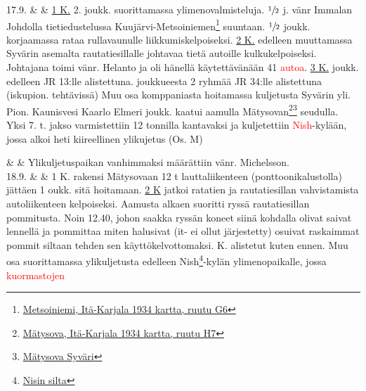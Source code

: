 \documentclass[11pt,a5paper,oneside]{book}
\begin{document}
\newpage

17.9. & & \underline{1 K.} 2. joukk. suorittamassa ylimenovalmisteluja. $\sfrac{1}{2}$ j. vänr Immalan Johdolla tietiedustelussa Kuujärvi-Metsoiniemen\footnote{\href{https://www.google.fi/maps/place/61\%C2\%B008'13.7\%22N+33\%C2\%B050'07.6\%22E/@61.1371306,33.8332443,1153m/}{Metsoiniemi, Itä-Karjala 1934 kartta, ruutu G6}} suuntaan. $\sfrac{1}{2}$ joukk. korjaamassa rataa rullavaunulle liikkumiskelpoiseksi. \newline\newline \underline{2 K.} edelleen muuttamassa Syvärin asemalta rautatiesillalle johtavaa tietä autoille kulkukelpoiseksi. Johtajana toimi vänr. Helanto ja oli hänellä käytettävänään 41 \textcolor{red}{autoa}. \newline\newline \underline{3 K.}  joukk. edelleen JR 13:lle alistettuna.  joukkueesta 2 ryhmää JR 34:lle alistettuna (iskupion. tehtävissä) Muu osa komppaniasta hoitamassa kuljetusta Syvärin yli. Pion. Kaunisvesi Kaarlo Elmeri  joukk. kaatui aamulla Mätysovan\footnote{\href{https://www.google.fi/maps/place/Myatusovo,+Leningrad+Oblast,+Russia,+187790/}{Mätysova, Itä-Karjala 1934 kartta, ruutu H7}}\footnote{\href{https://www.sotahistoriallisetkohteet.fi/app/sights/view/-/id/768/country/9/area/85/}{Mätysova Syväri}} seudulla. Yksi 7. t. jakso varmistettiin 12 tonnilla kantavaksi ja kuljetettiin \textcolor{red}{Nish}-kylään, jossa alkoi heti kiireellinen ylikujetus (Os. M) \\

\taulustop


& & Ylikuljetuspaikan vanhimmaksi määrättiin vänr. Michelsson. \newline\newline\newline \\

18.9. & & 1 K. rakensi Mätysovaan 12 t lauttaliikenteen (ponttoonikalustolla) jättäen 1 oukk. sitä hoitamaan. \newline\newline \underline{2 K} jatkoi ratatien ja rautatiesillan vahvistamista autoliikenteen kelpoiseksi. Aamusta alkaen suoritti ryssä rautatiesillan pommitusta. Noin 12.40, johon saakka ryssän koneet siinä kohdalla olivat saivat lennellä ja pommittaa miten halusivat (it- ei ollut järjestetty) osuivat raskaimmat pommit siltaan tehden sen käyttökelvottomaksi. \newline{} K. alistetut kuten ennen. Muu osa suorittamassa ylikuljetusta edelleen Nish\footnote{\href{https://www.sotahistoriallisetkohteet.fi/app/sights/view/-/id/610/country/9/area/85/}{Nisin silta}}-kylän ylimenopaikalle, jossa \textcolor{red}{kuormastojen} \\
\end{document}
